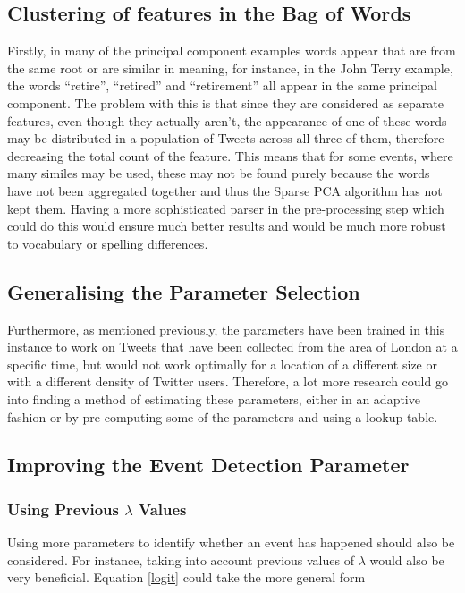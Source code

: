 \documentclass[11pt,a4paper]{article}
\begin{document}
\subsection{Clustering of features in the Bag of Words}
Firstly, in many of the principal component examples words appear that are from the same root or are similar in meaning, for instance, in the John Terry example, the words ``retire'', ``retired'' and ``retirement'' all appear in the same principal component. The problem with this is that since they are considered as separate features, even though they actually aren't, the appearance of one of these words may be distributed in a population of Tweets across all three of them, therefore decreasing the total count of the feature. This means that for some events, where many similes may be used, these may not be found purely because the words have not been aggregated together and thus the Sparse PCA algorithm has not kept them. Having a more sophisticated parser in the pre-processing step which could do this would ensure much better results and would be much more robust to vocabulary or spelling differences.

\subsection{Generalising the Parameter Selection}
Furthermore, as mentioned previously, the parameters have been trained in this instance to work on Tweets that have been collected from the area of London at a specific time, but would not work optimally for a location of a different size or with a different density of Twitter users. Therefore, a lot more research could go into finding a method of estimating these parameters, either in an adaptive fashion or by pre-computing some of the parameters and using a lookup table.

\subsection{Improving the Event Detection Parameter}
\subsubsection{Using Previous $\lambda$ Values}
Using more parameters to identify whether an event has happened should also be considered. For instance, taking into account previous values of $\lambda$ would also be very beneficial. Equation \eqref{logit} could take the more general form
\end{document}
